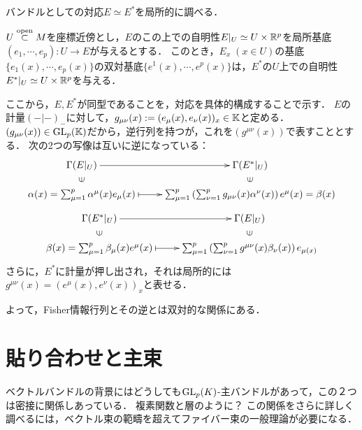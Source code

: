 \documentclass[uplatex,dvipdfmx]{jsreport}
\begin{document}
\begin{discussion}
    バンドルとしての対応$E\simeq E^*$を局所的に調べる．

    $U\overset{\mathrm{open}}{\subset} M$を座標近傍とし，$E$のこの上での自明性$E|_U\simeq U\times\mathbb{R}^p$を局所基底$(e_1,\cdots,e_p):U\to E$が与えるとする．
    このとき，$E_x\;(x\in U)$の基底$\{e_1(x),\cdots,e_p(x)\}$の双対基底$\{e^1(x),\cdots,e^p(x)\}$は，$E^*$の$U$上での自明性$E^*|_U\simeq U\times\mathbb{R}^p$を与える．

    ここから，$E,E^*$が同型であることを，対応を具体的構成することで示す．
    $E$の計量$(-|-)_-$に対して，$g_{\mu\nu}(x):=(e_\mu(x),e_\nu(x))_x\in\mathbb{K}$と定める．
    $(g_{\mu\nu}(x))\in\mathrm{GL}_p(\mathbb{K})$だから，逆行列を持つが，これを$(g^{\mu\nu}(x))$で表すこととする．
    次の2つの写像は互いに逆になっている：
    \[\xymatrix@R-2pc{
        \Gamma(E|_U)\ar[r]&\Gamma(E^*|_U)\\
        \rotatebox[origin=c]{90}{$\in$}&\rotatebox[origin=c]{90}{$\in$}\\
        \al(x)=\sum^p_{\mu=1}\al^\mu(x)e_\mu(x)\ar@{|->}[r]&\sum^p_{\mu=1}\paren{\sum^p_{\nu=1}g_{\mu\nu}(x)\al^\nu(x)}e^\mu(x)=\beta(x)
    }\]
    \[\xymatrix@R-2pc{
        \Gamma(E^*|_U)\ar[r]&\Gamma(E|_U)\\
        \rotatebox[origin=c]{90}{$\in$}&\rotatebox[origin=c]{90}{$\in$}\\
        \beta(x)=\sum^p_{\mu=1}\beta_\mu(x)e^\mu(x)\ar@{|->}[r]&\sum^p_{\mu=1}\paren{\sum^p_{\nu=1}g^{\mu\nu}(x)\beta_\nu(x)}e_{\mu(x)}
    }\]
    さらに，$E^*$に計量が押し出され，それは局所的には$g^{\mu\nu}(x)=(e^\mu(x),e^\nu(x))_x$と表せる．
\end{discussion}
\begin{remarks}
    よって，Fisher情報行列とその逆とは双対的な関係にある．
\end{remarks}

\section{貼り合わせと主束}

\begin{tcolorbox}[colframe=ForestGreen, colback=ForestGreen!10!white,breakable,colbacktitle=ForestGreen!40!white,coltitle=black,fonttitle=\bfseries\sffamily,
title=]
    ベクトルバンドルの背景にはどうしても$\mathrm{GL}_p(K)$-主バンドルがあって，この２つは密接に関係しあっている．
    複素関数と層のように？
    この関係をさらに詳しく調べるには，ベクトル束の範疇を超えてファイバー束の一般理論が必要になる．
\end{tcolorbox}
\end{document}
